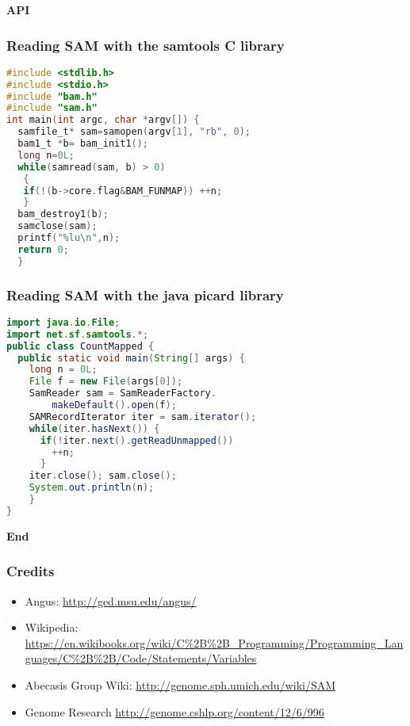 \documentclass{beamer}
\newcommand{\centeredtitle}[1]{
\begin{center}
    \Huge{\bf{#1}}
\end{center}
}
\newcommand{\hugeslide}[1]{
\begin{frame}
\centeredtitle{#1}
\end{frame}
}
\begin{document}
\hugeslide{API}

\begin{frame}[fragile]
\frametitle{Reading SAM with the samtools C library}

\begin{lstlisting}[language=C]
#include <stdlib.h>
#include <stdio.h>
#include "bam.h"
#include "sam.h"
int main(int argc, char *argv[]) {
  samfile_t* sam=samopen(argv[1], "rb", 0);
  bam1_t *b= bam_init1();
  long n=0L;
  while(samread(sam, b) > 0)
   {
   if(!(b->core.flag&BAM_FUNMAP)) ++n;
   }
  bam_destroy1(b);
  samclose(sam);
  printf("%lu\n",n);
  return 0;
  }
\end{lstlisting}
\end{frame}



\begin{frame}[fragile]
\frametitle{Reading SAM with the java picard library}

\begin{lstlisting}[language=java]
import java.io.File;
import net.sf.samtools.*;
public class CountMapped {
  public static void main(String[] args) {
    long n = 0L;
    File f = new File(args[0]);
    SamReader sam = SamReaderFactory.
		makeDefault().open(f);
    SAMRecordIterator iter = sam.iterator();
    while(iter.hasNext()) {
      if(!iter.next().getReadUnmapped())
      	++n;
      }
    iter.close(); sam.close();
    System.out.println(n);
    }
}
\end{lstlisting}
\end{frame}


\hugeslide{End}


\begin{frame}[fragile]
\frametitle{Credits}
\begin{itemize}
\item Angus: \url{http://ged.msu.edu/angus/}
\item Wikipedia: \url{https://en.wikibooks.org/wiki/C%2B%2B_Programming/Programming_Languages/C%2B%2B/Code/Statements/Variables}
\item Abecasis Group Wiki: \url{http://genome.sph.umich.edu/wiki/SAM}
\item Genome Research \url{http://genome.cshlp.org/content/12/6/996}
\end{itemize}
\end{frame}
\end{document}
